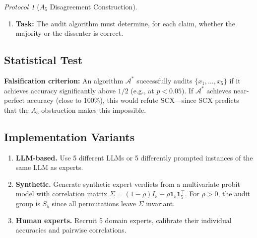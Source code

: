 \documentclass[12pt,a4paper]{article}
\theoremstyle{remark}
\newtheorem{protocol}[theorem]{Protocol}
\begin{document}
\begin{protocol}[\(A_5\) Disagreement Construction]
\begin{enumerate}[label=\textbf{Step \arabic*}:,itemsep=5pt,leftmargin=*]
\begin{center}
\begin{tabular}{c|ccccc}
        \(E_3\) & \(+1\) & \(+1\) & \textcolor{red}{\(-1\)} & \(+1\) & \(+1\) \\
        \(E_4\) & \(+1\) & \(+1\) & \(+1\) & \textcolor{red}{\(-1\)} & \(+1\) \\
        \(E_5\) & \(+1\) & \(+1\) & \(+1\) & \(+1\) & \textcolor{red}{\(-1\)} \\
        \bottomrule
    \end{tabular}
    \end{center}
    On each claim \(x_k\), expert \(E_k\) alone dissents. The disagreement pattern is a 5-cycle \(C_5\), which generates \(S_5\) (since \(C_5\) together with any transposition generates all of \(S_5\)). Thus \textbf{the audit group is \(S_5\), which contains \(A_5\)}.
    \item \textbf{Task:} The audit algorithm must determine, for each claim, whether the majority or the dissenter is correct.
\end{enumerate}
\end{protocol}

\subsection{Statistical Test}
\textbf{Falsification criterion:} An algorithm \(\mathcal{A}^*\) successfully audits \(\{x_1,\ldots,x_5\}\) if it achieves accuracy significantly above \(1/2\) (e.g., at \(p < 0.05\)). If \(\mathcal{A}^*\) achieves near-perfect accuracy (close to 100\%), this would refute SCX---since SCX predicts that the \(A_5\) obstruction makes this impossible.

\subsection{Implementation Variants}
\begin{enumerate}[label=(\Alph*),itemsep=3pt]
    \item \textbf{LLM-based.} Use 5 different LLMs or 5 differently prompted instances of the same LLM as experts.
    \item \textbf{Synthetic.} Generate synthetic expert verdicts from a multivariate probit model with correlation matrix \(\Sigma = (1-\rho)I_5 + \rho \mathbf{1}_5\mathbf{1}_5^\top\). For \(\rho > 0\), the audit group is \(S_5\) since all permutations leave \(\Sigma\) invariant.
    \item \textbf{Human experts.} Recruit 5 domain experts, calibrate their individual accuracies and pairwise correlations.
\end{enumerate}
\end{document}
